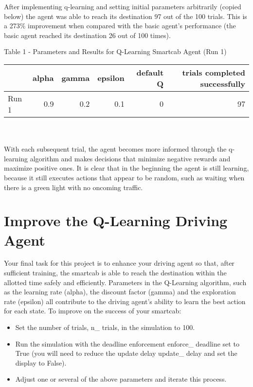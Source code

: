 \documentclass[11pt]{article}
\begin{document}
After implementing q-learning and setting initial parameters arbitrarily (copied below) the agent was able to reach its destination 97 out of the 100 trials. This is a 273\% improvement when compared with the basic agent’s performance (the basic agent reached its destination 26 out of 100 times).\\

\begin{center} Table 1 - Parameters and Results for Q-Learning Smartcab Agent (Run 1)
\end{center}
\begin{tabular}{ l r r r r r } \\
  \hline
  & alpha & gamma & epsilon & default Q & trials completed successfully\\
  \hline
  Run 1 & 0.9 & 0.2 & 0.1 & 0 & 97 \\
\end{tabular}
\\
\\

With each subsequent trial, the agent becomes more informed through the q-learning algorithm and makes decisions that minimize negative rewards and maximize positive ones. It is clear that in the beginning the agent is still learning, because it still executes actions that appear to be random, such as waiting when there is a green light with no oncoming traffic.\\

\section{Improve the Q-Learning Driving Agent}

Your final task for this project is to enhance your driving agent so that, after sufficient training, the smartcab is able to reach the destination within the allotted time safely and efficiently. Parameters in the Q-Learning algorithm, such as the learning rate (alpha), the discount factor (gamma) and the exploration rate (epsilon) all contribute to the driving agent’s ability to learn the best action for each state. To improve on the success of your smartcab:\\

\begin{itemize}
  \item Set the number of trials, n\_ trials, in the simulation to 100.
  \item Run the simulation with the deadline enforcement enforce\_ deadline set to True (you will need to reduce the update delay update\_ delay and set the display to False).
  \item Adjust one or several of the above parameters and iterate this process.
\end{itemize}
\end{document}
